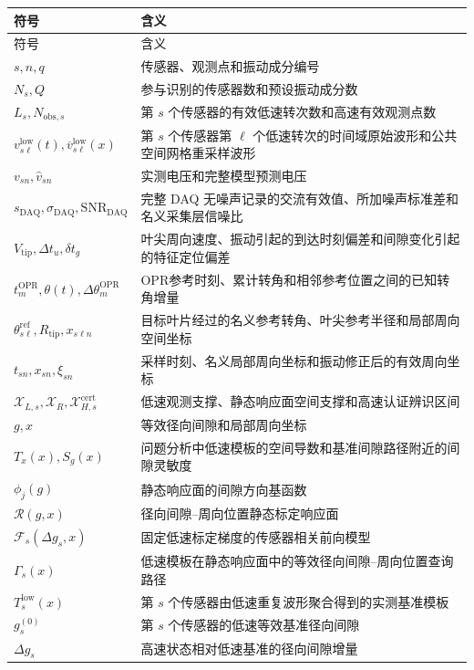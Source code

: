 \documentclass[UTF8,12pt,a4paper]{ctexart}
\newcommand{\Rcal}{\mathcal{R}}
\newcommand{\Fsen}{\mathcal{F}}
\begin{document}
\begin{longtable}{>{\centering\arraybackslash}p{}p{}}
\toprule
符号 & 含义\\
\midrule
\endfirsthead
\toprule
符号 & 含义\\
\midrule
\endhead
$s,n,q$ & 传感器、观测点和振动成分编号\\
$N_s,Q$ & 参与识别的传感器数和预设振动成分数\\
$L_s,N_{\mathrm{obs},s}$ & 第 $s$ 个传感器的有效低速转次数和高速有效观测点数\\
$v_{s\ell}^{\mathrm{low}}(t),\overline v_{s\ell}^{\mathrm{low}}(x)$ & 第 $s$ 个传感器第 $\ell$ 个低速转次的时间域原始波形和公共空间网格重采样波形\\
$v_{sn},\widehat v_{sn}$ & 实测电压和完整模型预测电压\\
$s_{\mathrm{DAQ}},\sigma_{\mathrm{DAQ}},\mathrm{SNR}_{\mathrm{DAQ}}$ & 完整 DAQ 无噪声记录的交流有效值、所加噪声标准差和名义采集层信噪比\\
$V_{\mathrm{tip}},\Delta t_u,\delta t_g$ & 叶尖周向速度、振动引起的到达时刻偏差和间隙变化引起的特征定位偏差\\
$t_m^{\mathrm{OPR}},\theta(t),\Delta\theta_m^{\mathrm{OPR}}$ & OPR参考时刻、累计转角和相邻参考位置之间的已知转角增量\\
$\theta_{s\ell}^{\mathrm{ref}},R_{\mathrm{tip}},x_{s\ell n}$ & 目标叶片经过的名义参考转角、叶尖参考半径和局部周向空间坐标\\
$t_{sn},x_{sn},\xi_{sn}$ & 采样时刻、名义局部周向坐标和振动修正后的有效周向坐标\\
$\mathcal X_{L,s},\mathcal X_R,\mathcal X_{H,s}^{\mathrm{cert}}$ & 低速观测支撑、静态响应面空间支撑和高速认证辨识区间\\
$g,x$ & 等效径向间隙和局部周向坐标\\
$T_x(x),S_g(x)$ & 问题分析中低速模板的空间导数和基准间隙路径附近的间隙灵敏度\\
$\phi_j(g)$ & 静态响应面的间隙方向基函数\\
$\Rcal(g,x)$ & 径向间隙--周向位置静态标定响应面\\
$\Fsen_s(\Delta g_s,x)$ & 固定低速标定梯度的传感器相关前向模型\\
$\Gamma_s(x)$ & 低速模板在静态响应面中的等效径向间隙--周向位置查询路径\\
$T_s^{\mathrm{low}}(x)$ & 第 $s$ 个传感器由低速重复波形聚合得到的实测基准模板\\
$g_s^{(0)}$ & 第 $s$ 个传感器的低速等效基准径向间隙\\
$\Delta g_s$ & 高速状态相对低速基准的径向间隙增量\\

\end{longtable}
\end{document}

